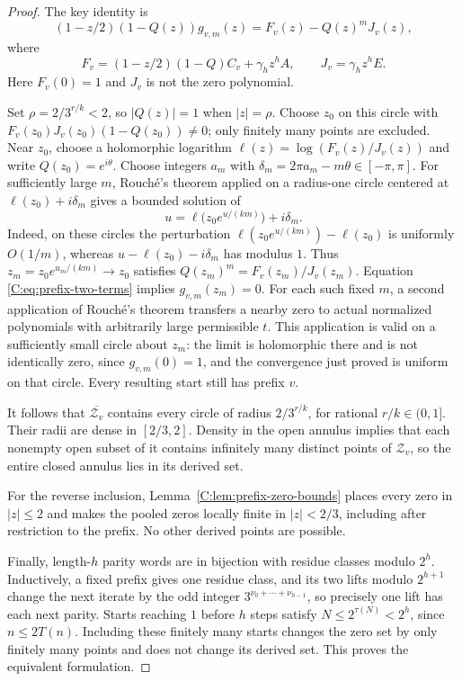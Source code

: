 \documentclass[11pt,a4paper]{article}
\theoremstyle{definition}
\theoremstyle{remark}
\numberwithin{equation}{section}
\begin{document}
\begin{proof}
The key identity is
\begin{equation}\label{C:eq:prefix-two-terms}
 (1-z/2)(1-Q(z))g_{v,m}(z)=F_v(z)-Q(z)^mJ_v(z),
\end{equation}
where
\[
 F_v=(1-z/2)(1-Q)C_v+\gamma_hz^hA,
 \qquad J_v=\gamma_hz^hE.
\]
Here $F_v(0)=1$ and $J_v$ is not the zero polynomial.

Set $\rho=2/3^{r/k}<2$, so $|Q(z)|=1$ when $|z|=\rho$.
Choose $z_0$ on this circle with
$F_v(z_0)J_v(z_0)(1-Q(z_0))\ne0$; only finitely many points are
excluded. Near $z_0$, choose a holomorphic logarithm
$\ell(z)=\log(F_v(z)/J_v(z))$ and write $Q(z_0)=e^{i\theta}$.
Choose integers $a_m$ with
$\delta_m=2\pi a_m-m\theta\in[-\pi,\pi]$.
For sufficiently large $m$, Rouch\'e's theorem applied on a radius-one
circle centered at $\ell(z_0)+i\delta_m$ gives a bounded solution of
\[
 u=\ell\bigl(z_0e^{u/(km)}\bigr)+i\delta_m.
\]
Indeed, on these circles the perturbation
$\ell(z_0e^{u/(km)})-\ell(z_0)$ is uniformly $O(1/m)$, whereas
$u-\ell(z_0)-i\delta_m$ has modulus $1$.
Thus $z_m=z_0e^{u_m/(km)}\to z_0$ satisfies
$Q(z_m)^m=F_v(z_m)/J_v(z_m)$. Equation
\eqref{C:eq:prefix-two-terms} implies $g_{v,m}(z_m)=0$.
For each such fixed $m$, a second application of Rouch\'e's theorem
transfers a nearby zero to actual normalized polynomials with arbitrarily
large permissible $t$. This application is valid on a sufficiently small
circle about $z_m$: the limit is holomorphic there and is not identically
zero, since $g_{v,m}(0)=1$, and the convergence just proved is uniform
on that circle. Every resulting start still has prefix $v$.

It follows that $\overline{\mathcal Z_v}$ contains every circle of
radius $2/3^{r/k}$, for rational $r/k\in(0,1]$. Their radii are dense
in $[2/3,2]$. Density in the open annulus implies that each nonempty
open subset of it contains infinitely many distinct points of
$\mathcal Z_v$, so the entire closed annulus lies in its derived set.

For the reverse inclusion, Lemma~\ref{C:lem:prefix-zero-bounds} places
every zero in $|z|\le2$ and makes the pooled zeros locally finite in
$|z|<2/3$, including after restriction to the prefix. No other derived
points are possible.

Finally, length-$h$ parity words are in bijection with residue classes
modulo $2^h$. Inductively, a fixed prefix gives one residue class, and
its two lifts modulo $2^{h+1}$ change the next iterate by the odd
integer $3^{\nu_0+\cdots+\nu_{h-1}}$, so precisely one lift has each
next parity. Starts reaching $1$ before $h$ steps satisfy
$N\le2^{\tau(N)}<2^h$, since $n\le2T(n)$. Including these finitely many
starts changes the zero set by only finitely many points and does not
change its derived set. This proves the equivalent formulation.
\end{proof}
\end{document}
